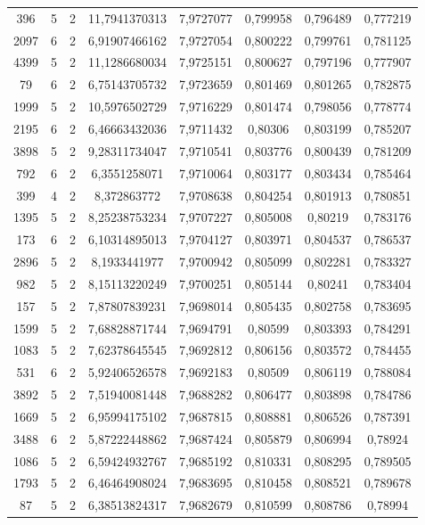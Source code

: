 \begin{longtable}{|c|c|c|c|c|c|c|c|}
396 & 5 & 2 & 11,7941370313 & 7,9727077 & 0,799958 & 0,796489 & 0,777219 \\
2097 & 6 & 2 & 6,91907466162 & 7,9727054 & 0,800222 & 0,799761 & 0,781125 \\
4399 & 5 & 2 & 11,1286680034 & 7,9725151 & 0,800627 & 0,797196 & 0,777907 \\
79 & 6 & 2 & 6,75143705732 & 7,9723659 & 0,801469 & 0,801265 & 0,782875 \\
1999 & 5 & 2 & 10,5976502729 & 7,9716229 & 0,801474 & 0,798056 & 0,778774 \\
2195 & 6 & 2 & 6,46663432036 & 7,9711432 & 0,80306 & 0,803199 & 0,785207 \\
3898 & 5 & 2 & 9,28311734047 & 7,9710541 & 0,803776 & 0,800439 & 0,781209 \\
792 & 6 & 2 & 6,3551258071 & 7,9710064 & 0,803177 & 0,803434 & 0,785464 \\
399 & 4 & 2 & 8,372863772 & 7,9708638 & 0,804254 & 0,801913 & 0,780851 \\
1395 & 5 & 2 & 8,25238753234 & 7,9707227 & 0,805008 & 0,80219 & 0,783176 \\
173 & 6 & 2 & 6,10314895013 & 7,9704127 & 0,803971 & 0,804537 & 0,786537 \\
2896 & 5 & 2 & 8,1933441977 & 7,9700942 & 0,805099 & 0,802281 & 0,783327 \\
982 & 5 & 2 & 8,15113220249 & 7,9700251 & 0,805144 & 0,80241 & 0,783404 \\
157 & 5 & 2 & 7,87807839231 & 7,9698014 & 0,805435 & 0,802758 & 0,783695 \\
1599 & 5 & 2 & 7,68828871744 & 7,9694791 & 0,80599 & 0,803393 & 0,784291 \\
1083 & 5 & 2 & 7,62378645545 & 7,9692812 & 0,806156 & 0,803572 & 0,784455 \\
531 & 6 & 2 & 5,92406526578 & 7,9692183 & 0,80509 & 0,806119 & 0,788084 \\
3892 & 5 & 2 & 7,51940081448 & 7,9688282 & 0,806477 & 0,803898 & 0,784786 \\
1669 & 5 & 2 & 6,95994175102 & 7,9687815 & 0,808881 & 0,806526 & 0,787391 \\
3488 & 6 & 2 & 5,87222448862 & 7,9687424 & 0,805879 & 0,806994 & 0,78924 \\
1086 & 5 & 2 & 6,59424932767 & 7,9685192 & 0,810331 & 0,808295 & 0,789505 \\
1793 & 5 & 2 & 6,46464908024 & 7,9683695 & 0,810458 & 0,808521 & 0,789678 \\
87 & 5 & 2 & 6,38513824317 & 7,9682679 & 0,810599 & 0,808786 & 0,78994 \\

\end{longtable}
